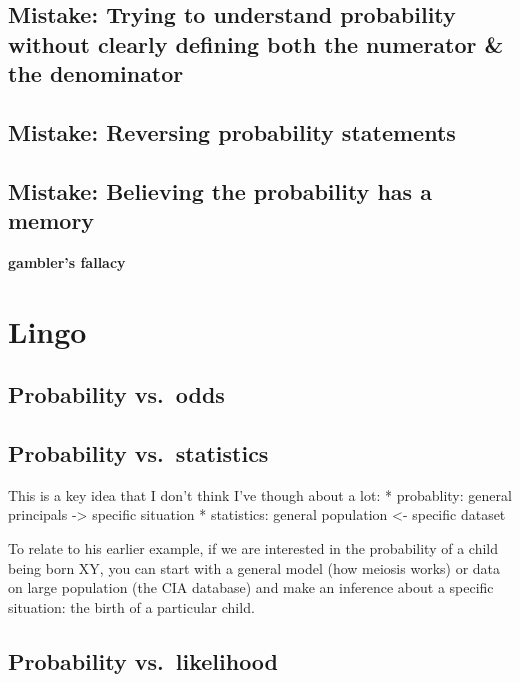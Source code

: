 \documentclass[]{book}
\theoremstyle{definition}
\theoremstyle{definition}
\theoremstyle{definition}
\theoremstyle{remark}
\begin{document}
\subsection{Mistake: Trying to understand probability without clearly
defining both the numerator \& the
denominator}\label{mistake-trying-to-understand-probability-without-clearly-defining-both-the-numerator-the-denominator}

\subsection{Mistake: Reversing probability
statements}\label{mistake-reversing-probability-statements}

\subsection{Mistake: Believing the probability has a
memory}\label{mistake-believing-the-probability-has-a-memory}

\textbf{gambler's fallacy}

\section{Lingo}\label{lingo}

\subsection{Probability vs.~odds}\label{probability-vs.odds}

\subsection{Probability vs.~statistics}\label{probability-vs.statistics}

This is a key idea that I don't think I've though about a lot: *
probablity: general principals -\textgreater{} specific situation *
statistics: general population \textless{}- specific dataset

To relate to his earlier example, if we are interested in the
probability of a child being born XY, you can start with a general model
(how meiosis works) or data on large population (the CIA database) and
make an inference about a specific situation: the birth of a particular
child.

\subsection{Probability vs.~likelihood}\label{probability-vs.likelihood}
\end{document}
